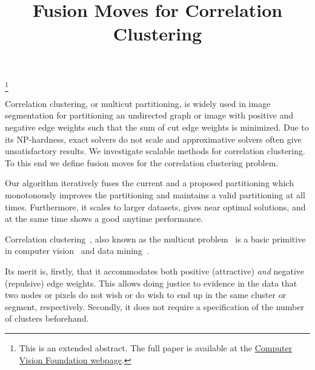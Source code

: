 \documentclass[extendedabs]{bmvc2k}
\begin{document}
\title{Fusion Moves for Correlation Clustering}
 
 
\maketitle
\let\thefootnote\relax\footnote{This is an extended abstract. The full paper is available at the \href{http://www.cv-foundation.org/openaccess/CVPR2015.py}{Computer Vision Foundation webpage}. }
\vspace{-0.2in}




\noindent
Correlation clustering, or multicut partitioning,
is widely used in image segmentation for
partitioning an undirected graph or image with positive and negative edge weights 
such that the sum of cut edge weights is minimized.
%
Due to its NP-hardness, exact solvers do not scale and approximative solvers often give unsatisfactory results.
We investigate scalable methods for correlation clustering.
To this end we define fusion moves for the correlation clustering problem.

Our algorithm iteratively fuses the current and a proposed partitioning which 
monotonously improves
the partitioning and maintains a valid partitioning at all times.
Furthermore, it scales to larger datasets, gives near optimal solutions, and at the same time shows
a good anytime performance.




Correlation clustering~\cite{Bansal-2002}, also known as the multicut problem~\cite{chopra_1993_mp} 
is a basic primitive in computer vision~\cite{andres_2011_iccv,kroeger_2012_eccv,yarkony_2012_eccv,alush_2013_simbad} and data mining~\cite{Arasu-2009,Sadikov-2010,Chen-2012,Chierichetti-2014}.
 
Its merit is, firstly, that it accommodates both positive (attractive) \emph{and} negative (repulsive) edge weights.
This allows doing justice to evidence in the data that two nodes or pixels do not wish or do wish to end up in the same cluster or segment, respectively.
Secondly, it does not require a specification of the number of clusters beforehand.
\end{document}
